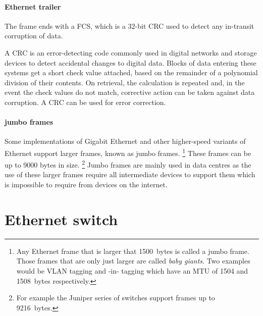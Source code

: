 \paragraph{Ethernet trailer}
The frame ends with a \acf{FCS}, which is a 32-bit \acf{CRC} used to detect any in-transit corruption of data.

A \acs{CRC} is an error-detecting code commonly used in digital networks and storage devices to detect accidental changes to digital data.
Blocks of data entering these systems get a short check value attached, based on the remainder of a polynomial division of their contents.
On retrieval, the calculation is repeated and, in the event the check values do not match, corrective action can be taken against data corruption.
A \acs{CRC} can be used for error correction.

\paragraph{jumbo frames} 
Some implementations of Gigabit Ethernet and other higher-speed variants of Ethernet support larger frames, known as jumbo frames.%
   \footnote{%
      Any Ethernet frame that is larger that {1500}~bytes is called a jumbo frame.
      Those frames that are only just larger are called \emph{baby giants}.
      Two examples would be \acs{VLAN} tagging and -in- tagging which have an \acs{MTU} of {1504} and {1508}~bytes respectively.}
These frames can be up to 9000 bytes in size.%
   \footnote{For example the Juniper  series of switches support frames up to {9216}~bytes.}
Jumbo frames are mainly used in data centres as the use of these larger frames require all intermediate devices to support them which is impossible to require from devices on the internet.






\section{Ethernet switch}
\label{sec:ethernet-switch}

